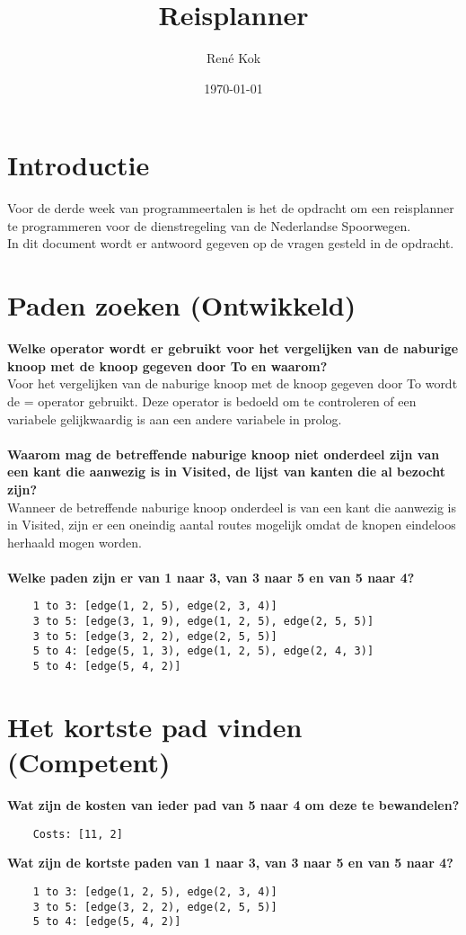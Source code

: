 \documentclass{uva-inf-article}
\title{Reisplanner}
\author{René Kok}
\date{\today}
\begin{document}
\maketitle

\section{Introductie}
Voor de derde week van programmeertalen is het de opdracht om een reisplanner te programmeren 
voor de dienstregeling van de Nederlandse Spoorwegen.\\
In dit document wordt er antwoord gegeven op de vragen gesteld in de opdracht.

\section{Paden zoeken (Ontwikkeld)}
\textbf{Welke operator wordt er gebruikt voor het vergelijken van de naburige knoop met de knoop gegeven door To en waarom?}\\
Voor het vergelijken van de naburige knoop met de knoop gegeven door To wordt de = operator gebruikt. 
Deze operator is bedoeld om te controleren of een variabele gelijkwaardig is aan een andere variabele in prolog.\\\\  
\textbf{Waarom mag de betreffende naburige knoop niet onderdeel zijn van een kant die aanwezig is in Visited, de lijst van kanten die al bezocht zijn?}\\
Wanneer de betreffende naburige knoop onderdeel is van een kant die aanwezig is in Visited, 
zijn er een oneindig aantal routes mogelijk omdat de knopen eindeloos herhaald mogen worden.\\\\
\textbf{Welke paden zijn er van 1 naar 3, van 3 naar 5 en van 5 naar 4?}

\begin{lstlisting}
    1 to 3: [edge(1, 2, 5), edge(2, 3, 4)]
    3 to 5: [edge(3, 1, 9), edge(1, 2, 5), edge(2, 5, 5)]
    3 to 5: [edge(3, 2, 2), edge(2, 5, 5)]
    5 to 4: [edge(5, 1, 3), edge(1, 2, 5), edge(2, 4, 3)]
    5 to 4: [edge(5, 4, 2)]
\end{lstlisting}

\newpage
\section{Het kortste pad vinden (Competent)}
\textbf{Wat zijn de kosten van ieder pad van 5 naar 4 om deze te bewandelen?}
\begin{lstlisting}
    Costs: [11, 2]
\end{lstlisting}
\textbf{Wat zijn de kortste paden van 1 naar 3, van 3 naar 5 en van 5 naar 4?}
\begin{lstlisting}
    1 to 3: [edge(1, 2, 5), edge(2, 3, 4)]
    3 to 5: [edge(3, 2, 2), edge(2, 5, 5)]
    5 to 4: [edge(5, 4, 2)]
\end{lstlisting}
\end{document}
